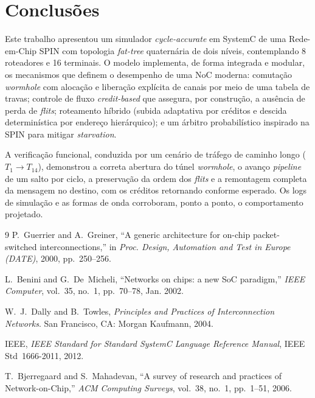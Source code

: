 \documentclass[conference]{IEEEtran}
\begin{document}
\section{Conclusões}
\label{sec:conclusao}

Este trabalho apresentou um simulador \emph{cycle-accurate} em SystemC de uma
Rede-em-Chip SPIN com topologia \emph{fat-tree} quaternária de dois níveis,
contemplando 8 roteadores e 16 terminais. O modelo implementa, de forma
integrada e modular, os mecanismos que definem o desempenho de uma NoC moderna:
comutação \emph{wormhole} com alocação e liberação explícita de canais por meio
de uma tabela de travas; controle de fluxo \emph{credit-based} que assegura, por
construção, a ausência de perda de \emph{flits}; roteamento híbrido (subida
adaptativa por créditos e descida determinística por endereço hierárquico); e um
árbitro probabilístico inspirado na SPIN para mitigar \emph{starvation}.

A verificação funcional, conduzida por um cenário de tráfego de caminho longo
($T_1 \rightarrow T_{14}$), demonstrou a correta abertura do túnel
\emph{wormhole}, o avanço \emph{pipeline} de um salto por ciclo, a preservação da
ordem dos \emph{flits} e a remontagem completa da mensagem no destino, com os
créditos retornando conforme esperado. Os logs de simulação e as formas de onda
corroboram, ponto a ponto, o comportamento projetado.

\begin{thebibliography}{9}
P.~Guerrier and A.~Greiner, ``A generic architecture for on-chip packet-switched
interconnections,'' in \emph{Proc. Design, Automation and Test in Europe (DATE)},
2000, pp.~250--256.

L.~Benini and G.~De~Micheli, ``Networks on chips: a new SoC paradigm,''
\emph{IEEE Computer}, vol.~35, no.~1, pp.~70--78, Jan. 2002.

W.~J.~Dally and B.~Towles, \emph{Principles and Practices of Interconnection
Networks}. San Francisco, CA: Morgan Kaufmann, 2004.

IEEE, \emph{IEEE Standard for Standard SystemC Language Reference Manual},
IEEE Std~1666-2011, 2012.

T.~Bjerregaard and S.~Mahadevan, ``A survey of research and practices of
Network-on-Chip,'' \emph{ACM Computing Surveys}, vol.~38, no.~1, pp.~1--51, 2006.
\end{thebibliography}
\end{document}
